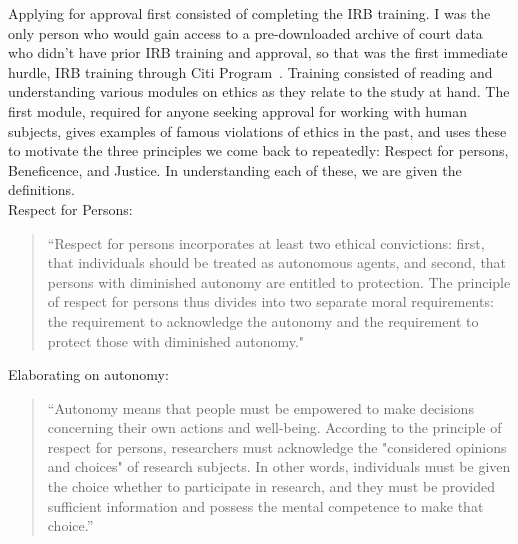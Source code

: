 Applying for approval first consisted of completing the IRB training.  I was the only person who would gain access to a pre-downloaded archive of court data who didn't have prior IRB training and approval, so that was the first immediate hurdle, IRB training through Citi Program~\citep{WEBSITE:9}.  Training consisted of reading and understanding various modules on ethics as they relate to the study at hand.  The first module, required for anyone seeking approval for working with human subjects, gives examples of famous violations of ethics in the past, and uses these to motivate the three principles we come back to repeatedly: Respect for persons, Beneficence, and Justice.  In understanding each of these, we are given the definitions.\\
Respect for Persons:
\begin{quote}
“Respect for persons incorporates at least two ethical convictions: first, that individuals should be treated as autonomous agents, and second, that persons with diminished autonomy are entitled to protection. The principle of respect for persons thus divides into two separate moral requirements: the requirement to acknowledge the autonomy and the requirement to protect those with diminished autonomy." ~\citep{WEBSITE:10}
\end{quote}
Elaborating on autonomy:
\begin{quote}
“Autonomy means that people must be empowered to make decisions concerning their own actions and well-being. According to the principle of respect for persons, researchers must acknowledge the "considered opinions and choices" of research subjects. In other words, individuals must be given the choice whether to participate in research, and they must be provided sufficient information and possess the mental competence to make that choice.” ~\citep{WEBSITE:10}
\end{quote}

